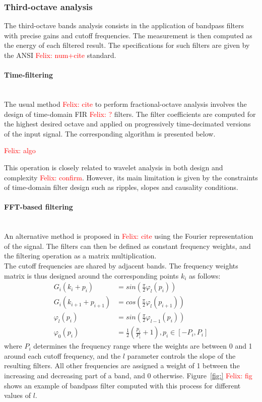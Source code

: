 \documentclass[12pt,times,onecolumn]{article}
\newcommand{\fg}[1]{\textcolor{red}{ Felix: #1}}
\begin{document}
\subsubsection{Third-octave analysis}
The third-octave bands analysis consists in the application of bandpass filters with precise gains and cutoff frequencies. The measurement is then computed as the energy of each filtered result. The specifications for such filters are given by the ANSI \fg{num+cite} standard.

\paragraph{Time-filtering\\\\}
The usual method \fg{cite} to perform fractional-octave analysis involves the design of time-domain FIR \fg{?} filters. The filter coefficients are computed for the highest desired octave and applied on progressively time-decimated versions of the input signal. The corresponding algorithm is presented below.

\fg{algo}

This operation is closely related to wavelet analysis in both design and complexity \fg{confirm}. However, its main limitation is given by the constraints of time-domain filter design such as ripples, slopes and causality conditions.

\paragraph{FFT-based filtering\\\\}
An alternative method is proposed in \fg{cite} using the Fourier representation of the signal. The filters can then be defined as constant frequency weights, and the filtering operation as a matrix multiplication.\\

The cutoff frequencies are shared by adjacent bands. The frequency weights matrix is thus designed around the corresponding points $k_i$ as follows:
\begin{align}
G_i(k_i+p_i) &= sin\left(\frac{\pi}{2}\varphi_l(p_i)\right)\\
G_i(k_{i+1}+p_{i+1}) &= cos\left(\frac{\pi}{2}\varphi_l(p_{i+1})\right)\\
\varphi_l(p_i) &= sin\left(\frac{\pi}{2}\varphi_{l-1}(p_i)\right)\\
\varphi_0(p_i) &= \frac{1}{2}\left(\frac{p_i}{P_i}+1\right), p_i \in [-P_i, P_i]
\end{align}
where $P_i$ determines the frequency range where the weights are between 0 and 1 around each cutoff frequency, and the $l$ parameter controls the slope of the resulting filters. All other frequencies are assigned a weight of 1 between the increasing and decreasing part of a band, and 0 otherwise. Figure~\ref{fig:}\fg{fig} shows an example of bandpass filter computed with this process for different values of $l$.\\
\end{document}
